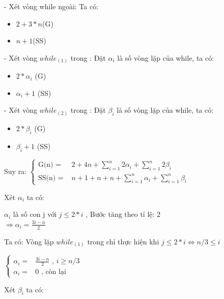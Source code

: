 \documentclass{article}
\newcommand\tab[1][1cm]{\hspace*{#1}}
\begin{document}
- Xét vòng while ngoài:
Ta có:
\begin{itemize}
    \item $ 2 + 3*n $(G)
    \item $ n + 1 $(SS)
\end{itemize}

- Xét vòng $while_{(1)}$ trong :
Đặt $\alpha_{i}$ là số vòng lặp của while, ta có:
\begin{itemize}
    \item $ 2*\alpha_{i}$ (G)
    \item $ \alpha_{i} + 1$ (SS)
\end{itemize}

\vspace{15mm}

- Xét vòng $while_{(2)}$ trong :
Đặt $\beta_{i}$ là số vòng lặp của while, ta có:
\begin{itemize}
    \item $ 2*\beta_{i}$ (G)
    \item $ \beta_{i} + 1$ (SS)
\end{itemize}

\tab Suy ra:
\(
\begin{cases}
    \text{G(n) = } & 2 + 4n +  \sum\limits_{i=1}^{n}2\alpha_{i} + \sum\limits_{i=1}^{n}2\beta_{i} \\
    \text{SS(n) = } &  n + 1 + n + n + \sum\limits_{i=1}^{n}\alpha_{i} + \sum\limits_{i=1}^{n}\beta_{i}
\end{cases}
\)
\vspace{20mm}

Xét $\alpha_{i}$ ta có:

\tab $\alpha_{i}$ là số con j với $j \leq 2*i $ , \(\text{Bước tăng theo tỉ lệ: } 2\)\\

\(\Rightarrow  \alpha_{i} = \frac{3i - n}{2}\) 
\vspace{5mm}

Ta có:
\tab Vòng lặp $while_{(1)}$ trong chỉ thực hiện khi $ j \leq 2*i \Longleftrightarrow n/3 \leq i$

\vspace{5mm}
\(
\begin{cases}
    \alpha_{i} =  & \frac{3i-n}{2} \text{ , } i \geq n/3  \\
    \alpha_{i} =  & 0 \text{ , còn lại}
\end{cases}
\)
 
\vspace{20mm}
Xét $\beta_{i}$ ta có:
\end{document}
